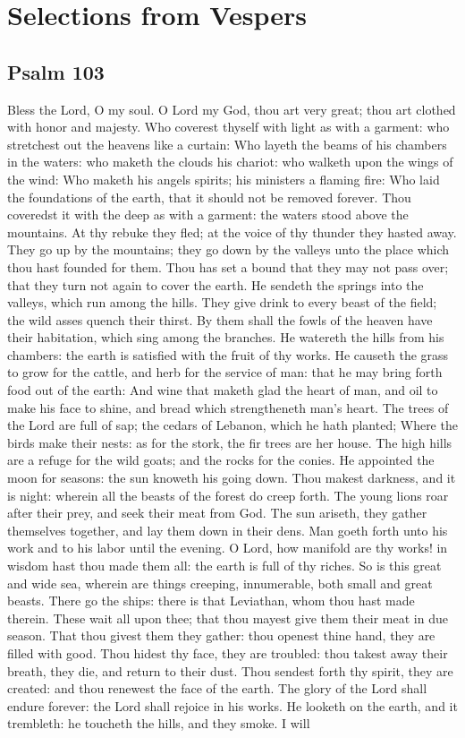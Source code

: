 \section{Selections from Vespers}

\subsection{Psalm 103}

Bless the Lord, O my soul. O Lord my God, thou art very great; thou art clothed with honor and majesty. Who coverest thyself with light as with a garment: who stretchest out the heavens like a curtain: Who layeth the beams of his chambers in the waters: who maketh the clouds his chariot: who walketh upon the wings of the wind: Who maketh his angels spirits; his ministers a flaming fire: Who laid the foundations of the earth, that it should not be removed forever. Thou coveredst it with the deep as with a garment: the waters stood above the mountains. At thy rebuke they fled; at the voice of thy thunder they hasted away. They go up by the mountains; they go down by the valleys unto the place which thou hast founded for them. Thou has set a bound that they may not pass over; that they turn not again to cover the earth. He sendeth the springs into the valleys, which run among the hills. They give drink to every beast of the field; the wild asses quench their thirst. By them shall the fowls of the heaven have their habitation, which sing among the branches. He watereth the hills from his chambers: the earth is satisfied with the fruit of thy works. He causeth the grass to grow for the cattle, and herb for the service of man: that he may bring forth food out of the earth: And wine that maketh glad the heart of man, and oil to make his face to shine, and bread which strengtheneth man's heart. The trees of the Lord are full of sap; the cedars of Lebanon, which he hath planted; Where the birds make their nests: as for the stork, the fir trees are her house. The high hills are a refuge for the wild goats; and the rocks for the conies. He appointed the moon for seasons: the sun knoweth his going down. Thou makest darkness, and it is night: wherein all the beasts of the forest do creep forth. The young lions roar after their prey, and seek their meat from God. The sun ariseth, they gather themselves together, and lay them down in their dens. Man goeth forth unto his work and to his labor until the evening. O Lord, how manifold are thy works! in wisdom hast thou made them all: the earth is full of thy riches. So is this great and wide sea, wherein are things creeping, innumerable, both small and great beasts. There go the ships: there is that Leviathan, whom thou hast made therein. These wait all upon thee; that thou mayest give them their meat in due season. That thou givest them they gather: thou openest thine hand, they are filled with good. Thou hidest thy face, they are troubled: thou takest away their breath, they die, and return to their dust. Thou sendest forth thy spirit, they are created: and thou renewest the face of the earth. The glory of the Lord shall endure forever: the Lord shall rejoice in his works. He looketh on the earth, and it trembleth: he toucheth the hills, and they smoke. I will 